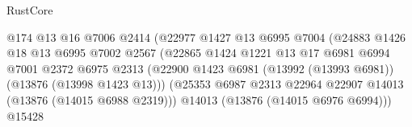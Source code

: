 \begin{lexlean}{RustCore}
\begin{coremodule}
                                                @174
                                                @13
                                                @16
                                                @7006
                                                @2414
                                                (@22977
                                                  @1427
                                                  @13
                                                  @6995
                                                  @7004
                                                  (@24883
                                                    @1426
                                                    @18
                                                    @13
                                                    @6995
                                                    @7002
                                                    @2567
                                                    (@22865
                                                      @1424
                                                      @1221
                                                      @13
                                                      @17
                                                      @6981
                                                      @6994
                                                      @7001
                                                      @2372
                                                      @6975
                                                      @2313
                                                      (@22900
                                                        @1423
                                                        @6981
                                                        (@13992 (@13993 @6981))
                                                        (@13876 (@13998 @1423 @13)))
                                                      (@25353
                                                        @6987
                                                        @2313
                                                        @22964
                                                        @22907
                                                        @14013
                                                        (@13876 (@14015 @6988 @2319)))
                                                      @14013
                                                      (@13876 (@14015 @6976 @6994)))
                                                    @15428

\end{coremodule}
\end{lexlean}
